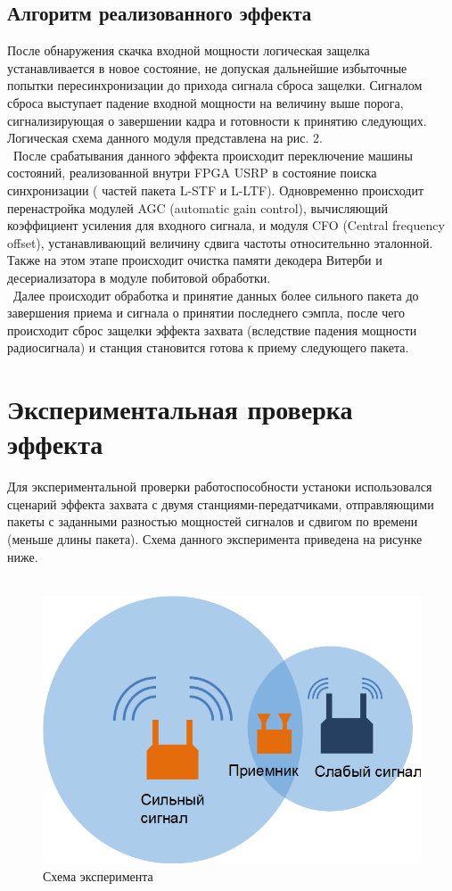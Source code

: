\documentclass{llncs}
\begin{document}
\subsection{Алгоритм реализованного эффекта}
После обнаружения скачка входной мощности логическая защелка устанавливается в новое состояние, не допуская дальнейшие избыточные попытки пересинхронизации до прихода сигнала сброса защелки. Сигналом сброса выступает падение входной мощности на величину выше порога, сигнализирующая о завершении кадра и готовности к принятию следующих.
Логическая схема данного модуля представлена на рис. 2.
\\\
После срабатывания данного эффекта происходит переключение машины состояний, реализованной внутри FPGA USRP в состояние поиска синхронизации ( частей пакета L-STF и L-LTF). Одновременно происходит перенастройка модулей AGC (automatic gain control), вычисляющий коэффициент усиления для входного сигнала, и модуля CFO (Central frequency offset), устанавливающий величину сдвига частоты относительнно эталонной. Также на этом этапе происходит очистка памяти декодера Витерби и десериализатора в модуле побитовой обработки. %
\\\
Далее происходит обработка и принятие данных более сильного пакета до завершения приема и сигнала о принятии последнего сэмпла, после чего происходит сброс защелки эффекта захвата (вследствие падения мощности радиосигнала) и станция становится готова к приему следующего пакета.



\section{Экспериментальная проверка эффекта}
Для экспериментальной проверки работоспособности устаноки использовался сценарий эффекта захвата с двумя станциями-передатчиками, отправляющими пакеты с заданными разностью мощностей сигналов и сдвигом по времени (меньше длины пакета). Схема данного эксперимента приведена на рисунке ниже. 
\\\
 \begin{figure}[ht!]
\centering
\includegraphics[width=\linewidth]{capture effect scheme.png}
\caption{Схема эксперимента \label{overflow}}
\end{figure}
\end{document}
